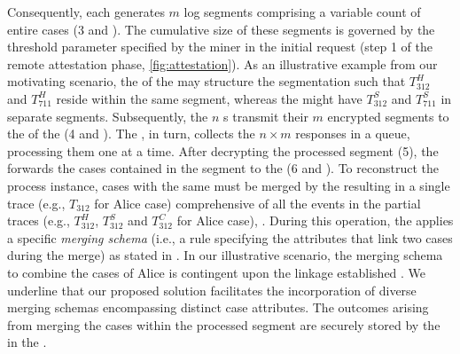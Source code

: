 Consequently, each  generates $m$ log segments comprising a variable count of entire cases (3 and ). The cumulative size of these segments is governed by the threshold parameter specified by the miner in the initial request (step 1 of the remote attestation phase, \cref{fig:attestation}). As an illustrative example from our motivating scenario, the  of the  may structure the segmentation such that $T^H_{312}$ and $T^H_{711}$ reside within the same segment, whereas the  might have $T^S_{312}$ and $T^S_{711}$ in separate segments. Subsequently, the $n$ s transmit their $m$ encrypted segments to the  of the  (4 and ). The , in turn, collects the $n \times m$ responses in a queue, processing them one at a time. After decrypting the processed segment (5), the  forwards the cases contained in the segment to the  (6 and ). To reconstruct the process instance, cases %
with the same \NewJ{{\CId}} must be merged by the  resulting in a single trace (e.g., $T_{312}$ for Alice case) comprehensive of all the events in the partial traces (e.g., $T^H_{312}$, $T^S_{312}$ and $T^C_{312}$ for Alice case), . During this operation, the  applies a specific \textit{merging schema} (i.e., a rule specifying the attributes that link two cases during the merge) as stated in \citep{claes2014merging}. In our illustrative scenario, the merging schema to combine the cases of Alice is contingent upon the linkage established . %
We underline that our proposed solution facilitates the incorporation of diverse merging schemas encompassing distinct case attributes. The outcomes arising from merging the cases within the processed segment are securely stored by the  in the .

